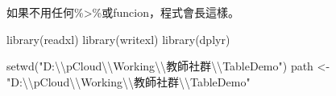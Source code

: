 \documentclass[
]{book}
\newenvironment{Shaded}{\begin{snugshade}}{\end{snugshade}}
\newcommand{\FunctionTok}[1]{\textcolor[rgb]{0.00,0.00,0.00}{#1}}
\newcommand{\NormalTok}[1]{#1}
\newcommand{\OtherTok}[1]{\textcolor[rgb]{0.56,0.35,0.01}{#1}}
\newcommand{\SpecialCharTok}[1]{\textcolor[rgb]{0.00,0.00,0.00}{#1}}
\newcommand{\StringTok}[1]{\textcolor[rgb]{0.31,0.60,0.02}{#1}}
\begin{document}
如果不用任何\%\textgreater\%或funcion，程式會長這樣。

\begin{Shaded}
\begin{Highlighting}[]
\FunctionTok{library}\NormalTok{(readxl)}
\FunctionTok{library}\NormalTok{(writexl)}
\FunctionTok{library}\NormalTok{(dplyr)}

\FunctionTok{setwd}\NormalTok{(}\StringTok{"D:}\SpecialCharTok{\textbackslash{}\textbackslash{}}\StringTok{pCloud}\SpecialCharTok{\textbackslash{}\textbackslash{}}\StringTok{Working}\SpecialCharTok{\textbackslash{}\textbackslash{}}\StringTok{教師社群}\SpecialCharTok{\textbackslash{}\textbackslash{}}\StringTok{TableDemo"}\NormalTok{)}
\NormalTok{path }\OtherTok{\textless{}{-}} \StringTok{"D:}\SpecialCharTok{\textbackslash{}\textbackslash{}}\StringTok{pCloud}\SpecialCharTok{\textbackslash{}\textbackslash{}}\StringTok{Working}\SpecialCharTok{\textbackslash{}\textbackslash{}}\StringTok{教師社群}\SpecialCharTok{\textbackslash{}\textbackslash{}}\StringTok{TableDemo"}


\end{Highlighting}
\end{Shaded}
\end{document}
